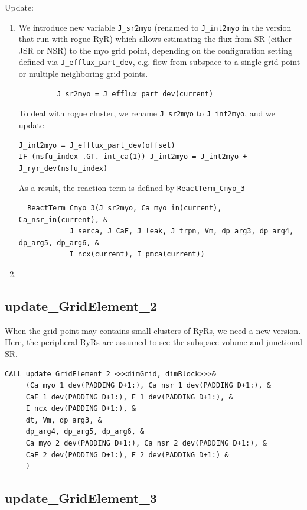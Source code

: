 Update:
\begin{enumerate}
  \item We introduce new variable \verb!J_sr2myo! (renamed to \verb!J_int2myo!
  in the version that run with rogue RyR) which allows estimating the flux from
  SR (either JSR or NSR) to the myo grid point, depending on the configuration setting defined via \verb!J_efflux_part_dev!, e.g. flow from
  subspace to a single grid point or multiple neighboring grid points.
  \begin{verbatim}
         J_sr2myo = J_efflux_part_dev(current) 
  \end{verbatim}
  
  To deal with rogue cluster, we rename \verb!J_sr2myo! to \verb!J_int2myo!, and
  we update
  \begin{verbatim}
J_int2myo = J_efflux_part_dev(offset)
IF (nsfu_index .GT. int_ca(1)) J_int2myo = J_int2myo + J_ryr_dev(nsfu_index)
  \end{verbatim}
  
  As a result, the reaction term is defined by \verb!ReactTerm_Cmyo_3!
  \begin{verbatim}
  ReactTerm_Cmyo_3(J_sr2myo, Ca_myo_in(current), Ca_nsr_in(current), &
            J_serca, J_CaF, J_leak, J_trpn, Vm, dp_arg3, dp_arg4, dp_arg5, dp_arg6, &
            I_ncx(current), I_pmca(current))
  \end{verbatim}
 \item 
\end{enumerate}

\subsection{update\_GridElement\_2}
\label{sec:update_gridelement_2}


When the grid point may contains small clusters of RyRs, we need a new version. 
Here, the peripheral RyRs are assumed to see the subspace volume and junctional
SR.
\begin{verbatim}
CALL update_GridElement_2 <<<dimGrid, dimBlock>>>&
     (Ca_myo_1_dev(PADDING_D+1:), Ca_nsr_1_dev(PADDING_D+1:), &
     CaF_1_dev(PADDING_D+1:), F_1_dev(PADDING_D+1:), &
     I_ncx_dev(PADDING_D+1:), &
     dt, Vm, dp_arg3, &
     dp_arg4, dp_arg5, dp_arg6, &
     Ca_myo_2_dev(PADDING_D+1:), Ca_nsr_2_dev(PADDING_D+1:), &
     CaF_2_dev(PADDING_D+1:), F_2_dev(PADDING_D+1:) &
     )
\end{verbatim}

\subsection{update\_GridElement\_3}
\label{sec:update_gridelement_3}

